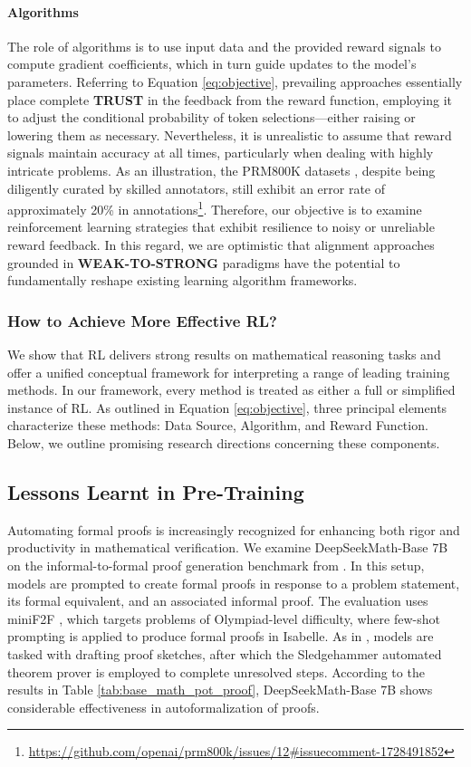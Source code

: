 \paragraph{Algorithms} The role of algorithms is to use input data and the provided reward signals to compute gradient coefficients, which in turn guide updates to the model’s parameters. Referring to Equation \ref{eq:objective}, prevailing approaches essentially place complete \textbf{TRUST} in the feedback from the reward function, employing it to adjust the conditional probability of token selections—either raising or lowering them as necessary. Nevertheless, it is unrealistic to assume that reward signals maintain accuracy at all times, particularly when dealing with highly intricate problems. As an illustration, the PRM800K datasets \citep{lightman2023let}, despite being diligently curated by skilled annotators, still exhibit an error rate of approximately 20\% in annotations\footnote{\url{https://github.com/openai/prm800k/issues/12\#issuecomment-1728491852}}. Therefore, our objective is to examine reinforcement learning strategies that exhibit resilience to noisy or unreliable reward feedback. In this regard, we are optimistic that alignment approaches grounded in \textbf{WEAK-TO-STRONG} paradigms \citep{burns2023weak} have the potential to fundamentally reshape existing learning algorithm frameworks.

\subsubsection{How to Achieve More Effective RL?}
\label{sec:effec_rl}
We show that RL delivers strong results on mathematical reasoning tasks and offer a unified conceptual framework for interpreting a range of leading training methods. In our framework, every method is treated as either a full or simplified instance of RL. As outlined in Equation \ref{eq:objective}, three principal elements characterize these methods: Data Source, Algorithm, and Reward Function. Below, we outline promising research directions concerning these components.

\subsection{Lessons Learnt in Pre-Training}

Automating formal proofs is increasingly recognized for enhancing both rigor and productivity in mathematical verification. We examine DeepSeekMath-Base 7B on the informal-to-formal proof generation benchmark from \citep{dsp_proof}. In this setup, models are prompted to create formal proofs in response to a problem statement, its formal equivalent, and an associated informal proof. The evaluation uses miniF2F \citep{minif2f}, which targets problems of Olympiad-level difficulty, where few-shot prompting is applied to produce formal proofs in Isabelle. As in \cite{dsp_proof}, models are tasked with drafting proof sketches, after which the Sledgehammer automated theorem prover \citep{sledgehammer} is employed to complete unresolved steps. According to the results in Table \ref{tab:base_math_pot_proof}, DeepSeekMath-Base 7B shows considerable effectiveness in autoformalization of proofs.

